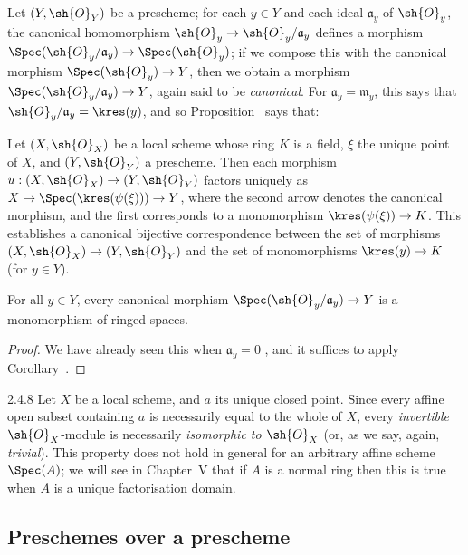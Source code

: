 Let $(Y,\sh{O}_Y)$ be a prescheme;
for each $y\in Y$ and each ideal $\mathfrak{a}_y$ of $\sh{O}_y$, the canonical homomorphism $\sh{O}_y\to\sh{O}_y/\mathfrak{a}_y$ defines a morphism $\Spec(\sh{O}_y/\mathfrak{a}_y)\to\Spec(\sh{O}_y)$;
if we compose this with the canonical morphism $\Spec(\sh{O}_y)\to Y$, then we obtain a morphism $\Spec(\sh{O}_y/\mathfrak{a}_y)\to Y$, again said to be \textit{canonical}.
For $\mathfrak{a}_y=\mathfrak{m}_y$, this says that $\sh{O}_y/\mathfrak{a}_y=\kres(y)$, and so Proposition~ says that:

\begin{corollary}[2.4.6]
\label{I.2.4.6}
Let $(X,\sh{O}_X)$ be a local scheme whose ring $K$ is a field, $\xi$ the unique point of $X$, and $(Y,\sh{O}_Y)$ a prescheme.
Then each morphism $u:(X,\sh{O}_X)\to(Y,\sh{O}_Y)$ factors uniquely as $X\to\Spec(\kres(\psi(\xi)))\to Y$, where the second arrow denotes the canonical morphism, and the first corresponds to a monomorphism $\kres(\psi(\xi))\to K$.
This establishes a canonical bijective correspondence between the set of morphisms $(X,\sh{O}_X)\to (Y,\sh{O}_Y)$ and the set of monomorphisms $\kres(y)\to K$ (for $y\in Y$).
\end{corollary}

\begin{corollary}[2.4.7]
\label{I.2.4.7}
For all $y\in Y$, every canonical morphism $\Spec(\sh{O}_y/\mathfrak{a}_y)\to Y$ is a monomorphism of ringed spaces.
\end{corollary}

\begin{proof}
We have already seen this when $\mathfrak{a}_y=0$ , and it suffices to apply Corollary~.
\end{proof}

\begin{remark}{2.4.8}
\label{I.2.4.8}
Let $X$ be a local scheme, and $a$ its unique closed point.
Since every affine open subset containing $a$ is necessarily equal to the whole of $X$, every \emph{invertible} $\sh{O}_X$-module  is necessarily \emph{isomorphic to $\sh{O}_X$} (or, as we say, again, \emph{trivial}).
This property does not hold in general for an arbitrary affine scheme $\Spec(A)$;
we will see in Chapter~V that if $A$ is a normal ring then this is true when $A$ is a unique factorisation domain.
\end{remark}

\subsection{Preschemes over a prescheme}
\label{subsection:I.2.5}

